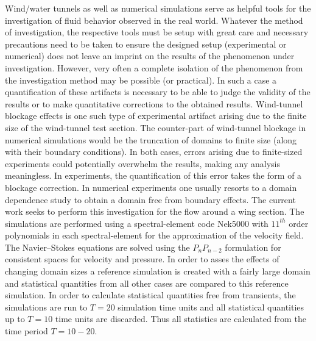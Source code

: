 Wind/water tunnels as well as numerical simulations serve as helpful tools for the investigation of fluid behavior observed in the real world. Whatever the method of investigation, the respective tools must be setup with great care and necessary precautions need to be taken to ensure the designed setup (experimental or numerical) does not leave an imprint on the results of the phenomenon under investigation. However, very often a complete isolation of the phenomenon from the investigation method may be possible (or practical). In such a case a quantification of these artifacts is necessary to be able to judge the validity of the results or to make quantitative corrections to the obtained results.  Wind-tunnel blockage effects is one such type of experimental artifact arising due to the finite size of the wind-tunnel test section. The counter-part of wind-tunnel blockage in numerical simulations would be the truncation of domains to finite size (along with their boundary conditions). In both cases, errors arising due to finite-sized experiments could potentially overwhelm the results, making any analysis meaningless. In experiments, the quantification of this error takes the form of a blockage correction. In numerical experiments one usually resorts to a domain dependence study to obtain a domain free from boundary effects. The current work seeks to perform this investigation for the flow around a wing section. The simulations are performed using a spectral-element code Nek5000 \citep{nek5000} with $11^{th}$ order polynomials in each spectral-element for the approximation of the velocity field. The Navier--Stokes equations are solved using the $P_{n}P_{n-2}$ formulation for consistent spaces for velocity and pressure. In order to asses the effects of changing domain sizes a reference simulation is created with a fairly large domain and statistical quantities from all other cases are compared to this reference simulation. In order to calculate statistical quantities free from transients, the simulations are run to $T=20$ simulation time units and all statistical quantities up to $T=10$ time units are discarded. Thus all statistics are calculated from the time period $T=10-20$. 

